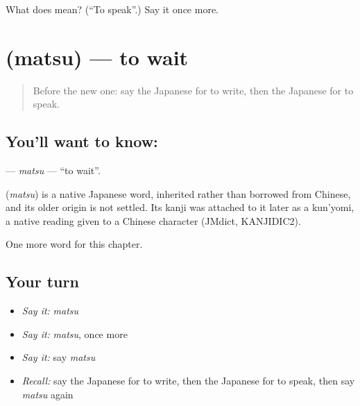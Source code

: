 \begin{tcolorbox}[breakable,colback=teal!4,colframe=teal!35!black,title={Before you move on}]
What does  mean? (\textquotedblleft{}To speak\textquotedblright{}.) Say it once more.
\end{tcolorbox}
\section[\texorpdfstring{\ja{まつ} (matsu)}{まつ (matsu)}]{ (matsu) — to wait}

\label{lesson:JA-C27-matsu}



\begin{quote}
Before the new one: say the Japanese for to write, then the Japanese for to speak.
\end{quote}

\subsection*{You'll want to know: }
\textbf{} — \emph{matsu} — \textquotedblleft{}to wait\textquotedblright{}.

\begin{cousinweb}
\textbf{} (\emph{matsu}) is a native Japanese word, inherited rather than borrowed from Chinese, and its older origin is not settled. Its kanji was attached to it later as a kun'yomi, a native reading given to a Chinese character (JMdict, KANJIDIC2).
\end{cousinweb}

\begin{grammarlens}[title={What you've built}]
One more word for this chapter.
\end{grammarlens}

\subsection*{Your turn}
\begin{itemize}
\raggedright
  \item \emph{Say it:} \emph{matsu}
  \item \emph{Say it:} \emph{matsu}, once more
  \item \emph{Say it:} say \emph{matsu}
  \item \emph{Recall:} say the Japanese for to write, then the Japanese for to speak, then say \emph{matsu} again
\end{itemize}

